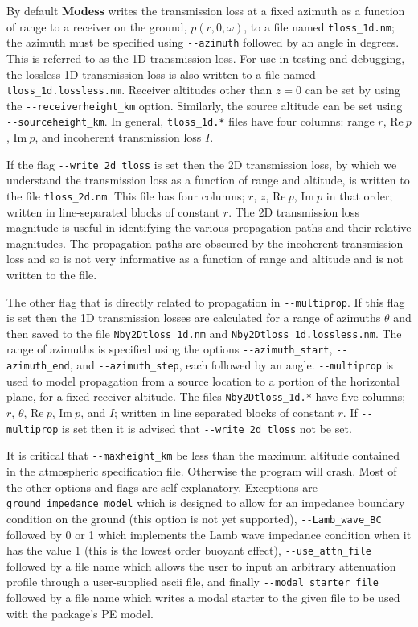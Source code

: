 By default {\bf Modess} writes the transmission loss at a fixed azimuth as a function of range to a receiver on the ground, $p(r,0,\omega)$, to a file named \verb+tloss_1d.nm+; the azimuth must be specified using \verb+--azimuth+ followed by an angle in degrees. This is referred to as the 1D transmission loss. For use in testing and debugging, the lossless 1D transmission loss is also written to a file named \verb+tloss_1d.lossless.nm+. Receiver altitudes other than $z=0$ can be set by using the \verb+--receiverheight_km+ option. Similarly, the source altitude can be set using \verb+--sourceheight_km+. In general, \verb+tloss_1d.*+ files have four columns: range $r$, $\text{Re}\ p$, $\text{Im}\ p$, and incoherent transmission loss $I$. 

If the flag \verb+--write_2d_tloss+ is set then the 2D transmission loss, by which we understand the transmission loss as a function of range and altitude, is written to the file \verb+tloss_2d.nm+.  This file has four columns; $r$, $z$, $\text{Re}\ p$, $\text{Im}\ p$ in that order; written in line-separated blocks of constant $r$. The 2D transmission loss magnitude is useful in identifying the various propagation paths and their relative magnitudes. The propagation paths are obscured by the incoherent transmission loss and so is not very informative as a function of range and altitude and is not written to the file. 

The other flag that is directly related to propagation in \verb+--multiprop+. If this flag is set then the 1D transmission losses are calculated for a range of azimuths $\theta$ and then saved to the file \verb+Nby2Dtloss_1d.nm+ and \verb+Nby2Dtloss_1d.lossless.nm+. The range of azimuths is specified using the options \verb+--azimuth_start+, \verb+--azimuth_end+, and \verb+--azimuth_step+, each followed by an angle. \verb+--multiprop+ is used to model propagation from a source location to a portion of the horizontal plane, for a fixed receiver altitude. The files \verb+Nby2Dtloss_1d.*+ have five columns; $r$, $\theta$, $\text{Re}\ p$, $\text{Im}\ p$, and $I$; written in line separated blocks of constant $r$. If \verb+--multiprop+ is set then it is advised that \verb+--write_2d_tloss+ not be set. 

It is critical that \verb+--maxheight_km+ be less than the maximum altitude contained in the atmospheric specification file. Otherwise the program will crash. Most of the other options and flags are self explanatory. Exceptions are \verb+--ground_impedance_model+ which is designed to allow for an impedance boundary condition on the ground (this option is not yet supported), \verb+--Lamb_wave_BC+ followed by 0 or 1 which implements the Lamb wave impedance condition when it has the value 1 (this is the lowest order buoyant effect), \verb+--use_attn_file+ followed by a file name which allows the user to input an arbitrary attenuation profile through a user-supplied ascii file, and finally \verb+--modal_starter_file+ followed by a file name which writes a modal starter to the given file to be used with the package's PE model. 

